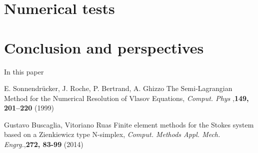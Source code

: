 \documentclass[11pt,a4paper]{amsart}
\begin{document}

\section{Numerical tests}
\setcounter{equation}{0}


%
%	
%


\section{Conclusion and perspectives}
\label{sec:conc}
\setcounter{equation}{0}

In this paper 


\begin{thebibliography}{99} 

{\sc E. Sonnendrücker, J. Roche, P. Bertrand, A. Ghizzo } The Semi-Lagrangian Method for the Numerical Resolution of Vlasov Equations, {\it Comput. Phys },{\bf 149, 201–220} (1999)  
  
  
{\sc Gustavo Buscaglia, Vitoriano Ruas } Finite element methods for the Stokes system based on a
Zienkiewicz type N-simplex, {\it Comput. Methods Appl. Mech. Engrg.},{\bf 272, 83-99} (2014)  
  

\end{thebibliography}



 
\end{document}

